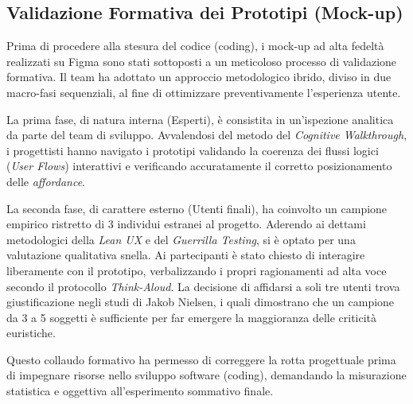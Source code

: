 \subsection{Validazione Formativa dei Prototipi (Mock-up)}
Prima di procedere alla stesura del codice (coding), i mock-up ad alta fedeltà realizzati su Figma sono stati sottoposti a un meticoloso processo di validazione formativa. Il team ha adottato un approccio metodologico ibrido, diviso in due macro-fasi sequenziali, al fine di ottimizzare preventivamente l'esperienza utente.

La prima fase, di natura interna (Esperti), è consistita in un'ispezione analitica da parte del team di sviluppo. Avvalendosi del metodo del \textit{Cognitive Walkthrough}, i progettisti hanno navigato i prototipi validando la coerenza dei flussi logici (\textit{User Flows}) interattivi e verificando accuratamente il corretto posizionamento delle \textit{affordance}.

La seconda fase, di carattere esterno (Utenti finali), ha coinvolto un campione empirico ristretto di 3 individui estranei al progetto. Aderendo ai dettami metodologici della \textit{Lean UX} e del \textit{Guerrilla Testing}, si è optato per una valutazione qualitativa snella. Ai partecipanti è stato chiesto di interagire liberamente con il prototipo, verbalizzando i propri ragionamenti ad alta voce secondo il protocollo \textit{Think-Aloud}. La decisione di affidarsi a soli tre utenti trova giustificazione negli studi di Jakob Nielsen, i quali dimostrano che un campione da 3 a 5 soggetti è sufficiente per far emergere la maggioranza delle criticità euristiche.

Questo collaudo formativo ha permesso di correggere la rotta progettuale prima di impegnare risorse nello sviluppo software (coding), demandando la misurazione statistica e oggettiva all'esperimento sommativo finale.

